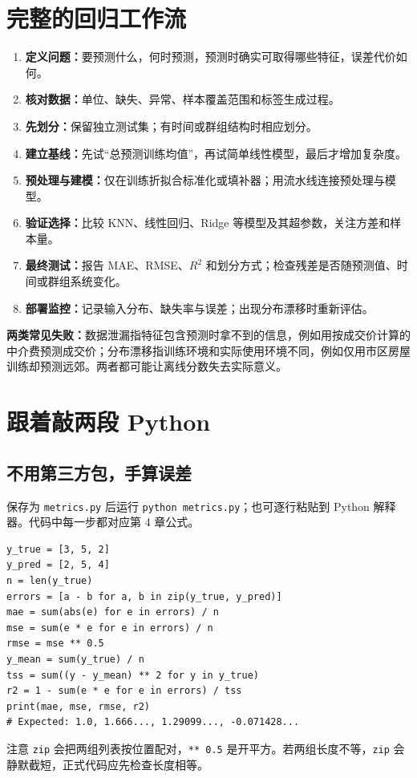 \documentclass[UTF8,11pt,oneside]{ctexbook}
\begin{document}
\chapter{完整的回归工作流}
\begin{enumerate}
\item \textbf{定义问题：}要预测什么，何时预测，预测时确实可取得哪些特征，误差代价如何。
\item \textbf{核对数据：}单位、缺失、异常、样本覆盖范围和标签生成过程。
\item \textbf{先划分：}保留独立测试集；有时间或群组结构时相应划分。
\item \textbf{建立基线：}先试“总预测训练均值”，再试简单线性模型，最后才增加复杂度。
\item \textbf{预处理与建模：}仅在训练折拟合标准化或填补器；用流水线连接预处理与模型。
\item \textbf{验证选择：}比较 KNN、线性回归、Ridge 等模型及其超参数，关注方差和样本量。
\item \textbf{最终测试：}报告 MAE、RMSE、$R^2$ 和划分方式；检查残差是否随预测值、时间或群组系统变化。
\item \textbf{部署监控：}记录输入分布、缺失率与误差；出现分布漂移时重新评估。
\end{enumerate}
\textbf{两类常见失败：}数据泄漏指特征包含预测时拿不到的信息，例如用按成交价计算的中介费预测成交价；分布漂移指训练环境和实际使用环境不同，例如仅用市区房屋训练却预测远郊。两者都可能让离线分数失去实际意义。

\chapter{跟着敲两段 Python}
\section{不用第三方包，手算误差}
保存为 \texttt{metrics.py} 后运行 \texttt{python metrics.py}；也可逐行粘贴到 Python 解释器。代码中每一步都对应第 4 章公式。
\begin{lstlisting}
y_true = [3, 5, 2]
y_pred = [2, 5, 4]
n = len(y_true)
errors = [a - b for a, b in zip(y_true, y_pred)]
mae = sum(abs(e) for e in errors) / n
mse = sum(e * e for e in errors) / n
rmse = mse ** 0.5
y_mean = sum(y_true) / n
tss = sum((y - y_mean) ** 2 for y in y_true)
r2 = 1 - sum(e * e for e in errors) / tss
print(mae, mse, rmse, r2)
# Expected: 1.0, 1.666..., 1.29099..., -0.071428...
\end{lstlisting}
注意 \texttt{zip} 会把两组列表按位置配对，\texttt{** 0.5} 是开平方。若两组长度不等，\texttt{zip} 会静默截短，正式代码应先检查长度相等。
\end{document}
